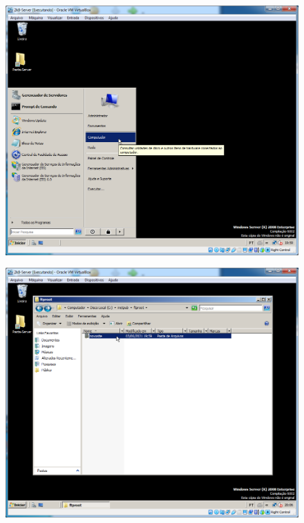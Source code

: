 \documentclass[10pt]{article}
\begin{document}
\begin{figure}[H]
    \centering
    \caption{}
    \label{fig:5411}
    \includegraphics[width=\linewidth]{images/windows_server/ftp/001.png}
\end{figure}
\begin{figure}[H]
    \centering
    \caption{}
    \label{fig:5412}
    \includegraphics[width=\linewidth]{images/windows_server/ftp/002.png}
\end{figure}
\end{document}
